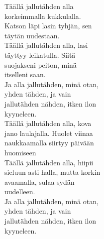 \begin{song}

    Täällä jallutähden alla\\
    korkeimmalla kukkulalla.\\
    Katson läpi lasin tyhjän, sen\\
    täytän uudestaan.\\

    Täällä jallutähden alla, lasi\\
    täyttyy leikatulla. Siitä\\
    suojakseni peiton, minä\\
    itselleni saan.\\

    Ja alla jallutähden, minä otan,\\
    yhden tähden, ja vain\\
    jallutähden nähden, itken ilon\\
    kyyneleen.\\

    Täällä jallutähden alla, kova\\
    jano laulajalla. Huolet viinaa\\
    naukkaamalla siirtyy päivään\\
    huomiseen\\

    Täällä jallutähden alla, hiipii\\
    sieluun asti halla, mutta korkin\\
    avaamalla, sulaa sydän\\
    uudelleen.\\

    Ja alla jallutähden, minä otan,\\
    yhden tähden, ja vain\\
    jallutähden nähden, itken ilon\\
    kyyneleen.

\end{song}